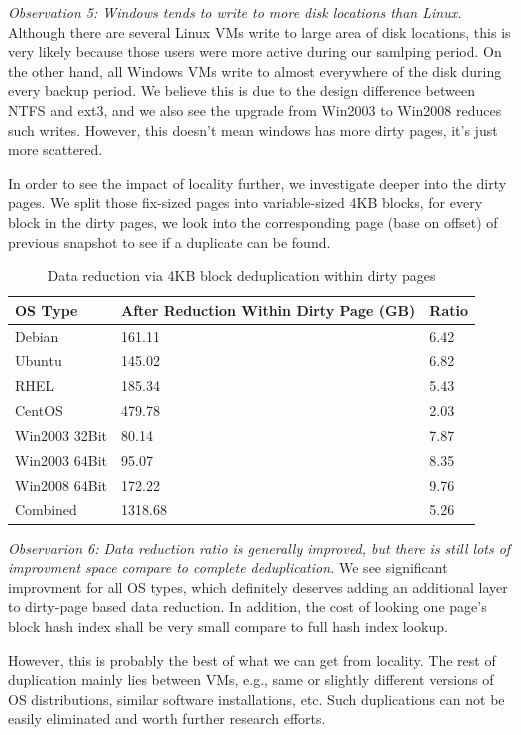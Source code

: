 \emph{Observation 5: Windows tends to write to more disk locations than Linux.} 
Although there are several Linux VMs write to large area of disk locations, this is very likely
because those users were more active during our samlping period.
On the other hand, all Windows VMs write to almost everywhere of the disk during every backup period.
We believe this is due to the design difference between NTFS and ext3, and we also see
the upgrade from Win2003 to Win2008 reduces such writes. However, this doesn't mean windows has more 
dirty pages, it's just more scattered.


In order to see the impact of locality further, we investigate deeper into the dirty pages.
We split those fix-sized pages into variable-sized 4KB blocks, for every block in the dirty pages,
we look into the corresponding
page (base on offset) of previous snapshot to see if a duplicate can be found.

\begin{table}[htb]
  \centering
    \begin{tabular}{|l|p{1.3in}|p{0.4in}|}
        \hline
        OS Type & After Reduction Within \newline Dirty Page (GB) & Ratio \\ \hline
        Debian & 161.11 & 6.42 \\ \hline
        Ubuntu & 145.02 & 6.82 \\ \hline
        RHEL & 185.34 & 5.43 \\ \hline
        CentOS & 479.78 & 2.03 \\ \hline
        Win2003 32Bit & 80.14 & 7.87 \\ \hline
        Win2003 64Bit & 95.07 & 8.35 \\ \hline
        Win2008 64Bit & 172.22 & 9.76 \\ \hline
        Combined & 1318.68 & 5.26 \\
        \hline
    \end{tabular}
    \caption{Data reduction via 4KB block deduplication within dirty pages}
    \label{tab:locality}
\end{table}

\emph{Observarion 6: Data reduction ratio is generally improved, but there is still lots of
improvment space compare to complete deduplication.} We see significant improvment for all OS
types, which definitely deserves adding an additional layer to dirty-page based 
data reduction. In addition, the cost of looking one page's block hash index
shall be very small compare to full hash index lookup.

However, this is probably the best of what we can get from locality. The rest of
duplication mainly lies between VMs, e.g., same or slightly different versions of OS distributions, 
similar software installations, etc. Such duplications can not be easily 
eliminated and worth further research efforts.
